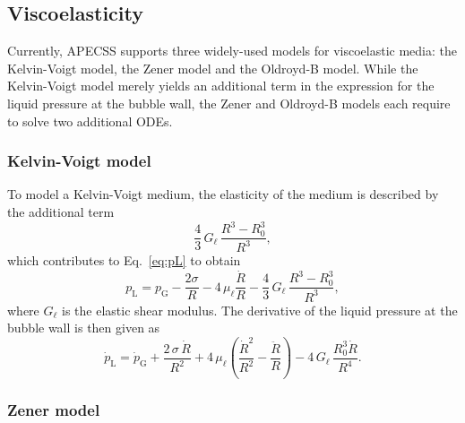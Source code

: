 \subsection{Viscoelasticity}

Currently, APECSS supports three widely-used models for viscoelastic media: the Kelvin-Voigt model, the Zener model and the Oldroyd-B model. While the Kelvin-Voigt model merely yields an additional term in the expression for the liquid pressure at the bubble wall, the Zener and Oldroyd-B models each require to solve two additional ODEs.

\subsubsection{Kelvin-Voigt model}

To model a Kelvin-Voigt medium, the elasticity of the medium is described by the additional term 
\begin{equation}
    \frac{4}{3} \, G_\ell \, \frac{R^3-R_0^3}{R^3}, \label{eq:KVterm}
\end{equation}
which contributes to Eq.~\eqref{eq:pL} to obtain
\begin{equation}
    p_\text{L} = p_\text{G} - \frac{2 \sigma}{R} - 4 \, \mu_\ell \frac{\dot{R}}{R} - \frac{4}{3} \, G_\ell \, \frac{R^3-R_0^3}{R^3}, \label{eq:pL_KV}
\end{equation}
where $G_\ell$ is the elastic shear modulus.
The derivative of the liquid pressure at the bubble wall is then given as
\begin{equation}
    \dot{p}_\mathrm{L} = \dot{p}_\mathrm{G} + \frac{2 \, \sigma \, \dot{R}}{R^2} + 4 \, \mu_\ell \left(\frac{\dot{R}^2}{R^2} - \frac{\ddot{R}}{R}\right) - 4 \, G_\ell \, \frac{R_0^3 \dot{R}}{R^4}.
    \label{eq:dotpL_KV}
\end{equation}

\subsubsection{Zener model}

